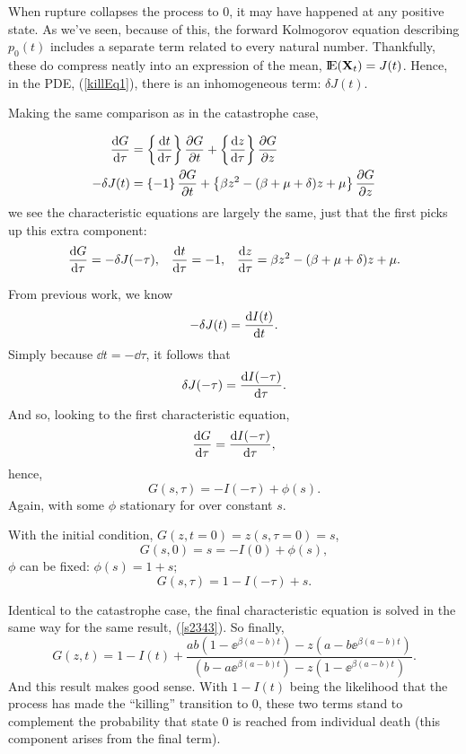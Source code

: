 When rupture collapses the process to 0, it may have happened at any positive state.  As we've seen, because of this, the forward Kolmogorov equation describing $p_0(t)$ includes a separate term related to every natural number. Thankfully, these do compress neatly into an expression of the mean, ${\rm I}\!{\rm E}({{\bf X}_t}) = J(t)$. Hence, in the PDE, (\ref{killEq1}), there is an inhomogeneous term: $\delta J(t)$.\par
Making the same comparison as in the catastrophe case, 

\begin{align*}
\displaystyle\frac{{\rm d} G}{{\rm d} \tau} &=  \left\{\displaystyle\frac{{\rm d} t}{{\rm d} \tau}\right\}  \displaystyle\frac{\partial G}{\partial t}+ \left\{\displaystyle\frac{{\rm d} z}{{\rm d} \tau} \right\}\displaystyle\frac{\partial G}{\partial z}\\
-\delta J(t)&=  \left\{- 1\right\}\displaystyle\frac{\partial G}{\partial t} + \left\{\beta z^2 -( \beta + \mu + \delta)z + \mu\right\} \displaystyle\frac{\partial G}{\partial z}
\end{align*}
we see the characteristic equations are largely the same, just that the first picks up this extra component: 
\begin{align*}
\label{Char2}
\displaystyle\frac{{\rm d} G}{{\rm d} \tau} = -\delta J(-\tau),&& \displaystyle\frac{{\rm d} t}{{\rm d} \tau} = -1, && \displaystyle\frac{{\rm d} z}{{\rm d} \tau} = \beta z^2 - (\beta + \mu + \delta)z + \mu.
\end{align*}



\noindent
From previous work, we know 
$$-\delta J(t) = \displaystyle\frac{{\rm d} I(t)}{{\rm d} t}.$$
Simply because $\dd t = -\dd \tau$, it follows that 
$$\delta J(-\tau) = \displaystyle\frac{{\rm d} I(-\tau)}{{\rm d} \tau}.$$
And so, looking to the first characteristic equation, 
$$\displaystyle\frac{{\rm d} G}{{\rm d} \tau} = \displaystyle\frac{{\rm d} I(-\tau)}{{\rm d} \tau},$$
hence,
$$G(s,\tau) = -I(-\tau) + \phi(s).$$
Again, with some $\phi$ stationary for over constant $s$. \par
With the initial condition, $G(z, t=0) = z(s, \tau = 0) = s$,
$$G(s,0) =s= -I(0) + \phi(s),$$
$\phi$ can be fixed: $\phi(s) = 1 + s;$
$$G(s,\tau) = 1 - I(-\tau) + s.$$\par
Identical to the catastrophe case, the final characteristic equation is solved in the same way for the same result, (\ref{s2343}). So finally, 
$$G(z,t) = 1 - I(t)  + \frac{ab(1-\ee^{\beta(a-b) t}) - z(a-b\ee^{\beta(a-b) t}) } {  (b-a\ee^{\beta(a-b) t}) -z(1-\ee^{\beta(a-b) t})  }.$$
And this result makes good sense. With $1 - I(t)$ being the likelihood that the process has made the ``killing'' transition to 0, these two terms stand to complement the probability that state $0$ is reached from individual death (this component arises from the final term).
